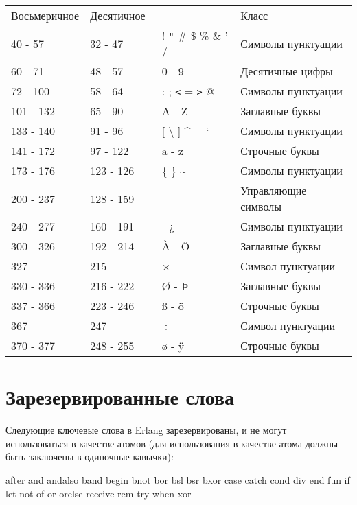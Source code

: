 \vspace*{12pt}
\begin{center}
\begin{tabular}{|>{\raggedright}p{52pt}|>{\raggedright}p{53pt}|>{\raggedright}p{103pt}|>{\raggedright}p{87pt}|}
\hline
\multicolumn{4}{|p{297pt}|}{Классы символов в кодировке}\tabularnewline
\hline
Восьме\-ричное & Деся\-тичное~ &   & Класс \tabularnewline
\hline
40 -  57 & 32 - 47 &  ! \texttt{"} \# \$ \% \& ' / & Символы пунктуации \tabularnewline
\hline
60 -  71 & 48 - 57 & 0 - 9 & Десятичные цифры \tabularnewline
\hline
72 - 100 & 58 - 64 & : ; \texttt{<} = \texttt{>} @ & Символы пунктуации \tabularnewline
\hline
101 - 132 &  65 - 90 & A - Z & Заглавные буквы \tabularnewline
\hline
133 - 140 &  91 - 96 & [ \textbackslash{} ] \textasciicircum{} \_ ` & Символы пунктуации \tabularnewline
\hline
141 - 172 &  97 - 122 & a  -  z & Строчные буквы \tabularnewline
\hline
173 - 176 & 123 - 126 & \{ \textbar{} \} \textasciitilde{} & Символы пунктуации \tabularnewline
\hline
200 - 237 & 128 - 159 ~ &   & Управляющие символы \tabularnewline
\hline
240 - 277 & 160 - 191 & - ¿  & Символы пунктуации \tabularnewline
\hline
300 - 326 & 192 - 214 & À - Ö  & Заглавные буквы \tabularnewline
\hline
327  & 215 & ×  & Символ пунктуации \tabularnewline
\hline
330 - 336 & 216 - 222 & Ø - Þ  & Заглавные буквы \tabularnewline
\hline
337 - 366 & 223 - 246 & ß - ö  & Строчные буквы \tabularnewline
\hline
367  & 247 & ÷  & Символ пунктуации \tabularnewline
\hline
370 - 377 & 248 - 255 & ø - ÿ  & Строчные буквы \tabularnewline
\hline
\end{tabular}
\end{center}

\newpage
\section{Зарезервированные слова}


Следующие ключевые слова в Erlang зарезервированы, и не могут использоваться в
качестве атомов (для использования в качестве атома должны быть заключены в 
одиночные кавычки):

\begin{erlang}
after and andalso band begin bnot bor bsl bsr bxor case catch cond
div end fun if let not of or orelse receive rem try when xor
\end{erlang}
